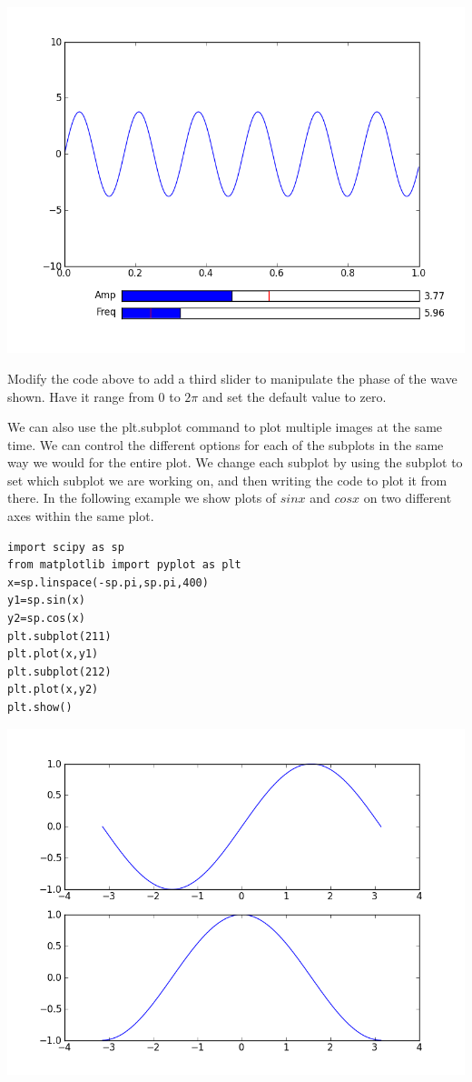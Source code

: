 \includegraphics[width=\textwidth]{interact.png}

\begin{problem}
Modify the code above to add a third slider to manipulate the phase of the wave shown. Have it range from 0 to $2\pi$ and set the default value to zero.
\end{problem}

We can also use the plt.subplot command to plot multiple images at the same time. We can control the different options for each of the subplots in the same way we would for the entire plot. We change each subplot by using the subplot to set which subplot we are working on, and then writing the code to plot it from there. In the following example we show plots of $sin x$ and $cos x$ on two different axes within the same plot.
\begin{lstlisting}
import scipy as sp
from matplotlib import pyplot as plt
x=sp.linspace(-sp.pi,sp.pi,400)
y1=sp.sin(x)
y2=sp.cos(x)
plt.subplot(211)
plt.plot(x,y1)
plt.subplot(212)
plt.plot(x,y2)
plt.show()
\end{lstlisting}

\includegraphics[width=\textwidth]{subplots.png}

